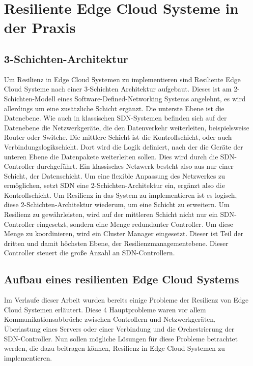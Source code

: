 \newpage
\section{Resiliente Edge Cloud Systeme in der Praxis} \label{latexDetails}

\subsection{3-Schichten-Architektur}

Um Resilienz in Edge Cloud Systemen zu implementieren sind Resiliente Edge Cloud Systeme nach einer 3-Schichten Architektur aufgebaut. Dieses ist am 2-Schichten-Modell eines Software-Defined-Networking Systems angelehnt, 
es wird allerdings um eine zusätzliche Schicht ergänzt. Die unterste Ebene ist die Datenebene. Wie auch in klassischen SDN-Systemen befinden sich auf der Datenebene die Netzwerkgeräte, die den Datenverkehr weiterleiten, 
beispielsweise Router oder Switche. Die mittlere Schicht ist die Kontrollschicht, oder auch Verbindungslogikschicht. Dort wird die Logik definiert, nach der die Geräte der unteren Ebene die Datenpakete weiterleiten sollen. 
Dies wird durch die SDN-Controller durchgeführt. Ein klassisches Netzwerk besteht also aus nur einer Schicht, der Datenschicht. Um eine flexible Anpassung des Netzwerkes zu ermöglichen, 
setzt SDN eine 2-Schichten-Architektur ein, ergänzt also die Kontrollschicht. Um Resilienz in das System zu implementieren ist es logisch, diese 2-Schichten-Architektur wiederum, um eine Schicht zu erweitern. 
Um Resilienz zu gewährleisten, wird auf der mittleren Schicht nicht nur ein SDN-Controller eingesetzt, sondern eine Menge redundanter Controller. Um diese Menge zu koordinieren, wird ein Cluster Manager eingesetzt. 
Dieser ist Teil der dritten und damit höchsten Ebene, der Resilienzmanagementebene. Dieser Controller steuert die große Anzahl an SDN-Controllern.



\subsection{Aufbau eines resilienten Edge Cloud Systems}


Im Verlaufe dieser Arbeit wurden bereits einige Probleme der Resilienz von Edge Cloud Systemen erläutert. Diese 4 Hauptprobleme waren vor allem Kommunikationsabbrüche zwischen Controllern und Netzwerkgeräten, 
Überlastung eines Servers oder einer Verbindung und die Orchestrierung der SDN-Controller. Nun sollen mögliche Lösungen für diese Probleme betrachtet werden, die dazu beitragen können, 
Resilienz in Edge Cloud Systemen zu implementieren. 

